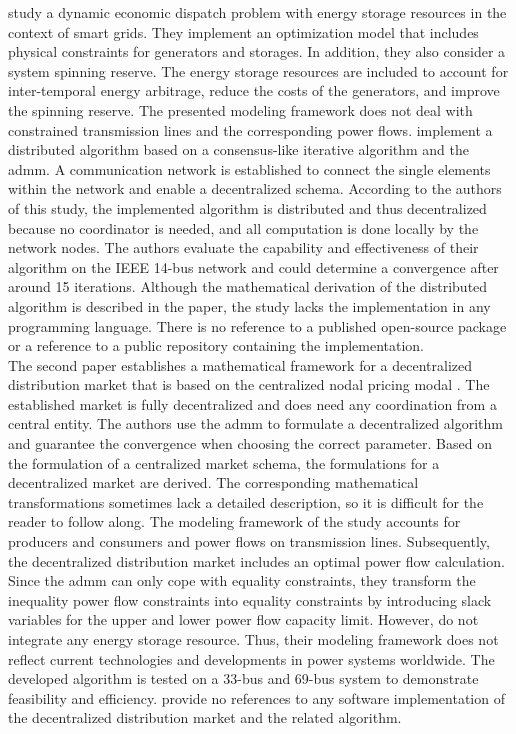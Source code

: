 \citet{xing2017} study a dynamic economic dispatch problem with energy storage resources in the context of smart grids. They implement an optimization model that includes physical constraints for generators and storages. In addition, they also consider a system spinning reserve. The energy storage resources are included to account for inter-temporal energy arbitrage, reduce the costs of the generators, and improve the spinning reserve. The presented modeling framework does not deal with constrained transmission lines and the corresponding power flows. \citet{xing2017} implement a distributed algorithm based on a consensus-like iterative algorithm and the \gls{admm}. A communication network is established to connect the single elements within the network and enable a decentralized schema. According to the authors of this study, the implemented algorithm is distributed and thus decentralized because no coordinator is needed, and all computation is done locally by the network nodes. The authors evaluate the capability and effectiveness of their algorithm on the IEEE 14-bus network and could determine a convergence after around 15 iterations. Although the mathematical derivation of the distributed algorithm is described in the paper, the study lacks the implementation in any programming language. There is no reference to a published open-source package or a reference to a public repository containing the implementation. \\

The second paper establishes a mathematical framework for a decentralized distribution market that is based on the centralized nodal pricing modal \citep{yang2019}. The established market is fully decentralized and does need any coordination from a central entity. The authors use the \gls{admm} to formulate a decentralized algorithm and guarantee the convergence when choosing the correct parameter. Based on the formulation of a centralized market schema, the formulations for a decentralized market are derived. The corresponding mathematical transformations sometimes lack a detailed description, so it is difficult for the reader to follow along. The modeling framework of the study accounts for producers and consumers and power flows on transmission lines. Subsequently, the decentralized distribution market includes an optimal power flow calculation. Since the \gls{admm} can only cope with equality constraints, they transform the inequality power flow constraints into equality constraints by introducing slack variables for the upper and lower power flow capacity limit. However, \citet{yang2019} do not integrate any energy storage resource. Thus, their modeling framework does not reflect current technologies and developments in power systems worldwide. The developed algorithm is tested on a 33-bus and 69-bus system to demonstrate feasibility and efficiency. \citet{yang2019} provide no references to any software implementation of the decentralized distribution market and the related algorithm. \\

